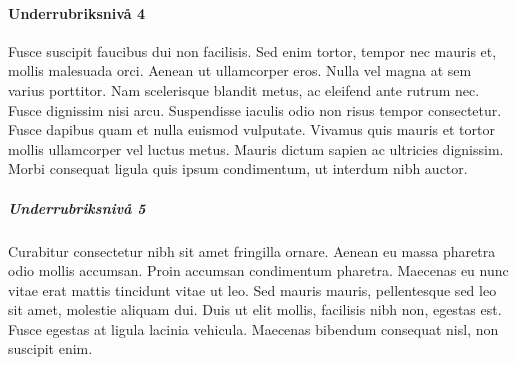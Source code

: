 \documentclass[a4paper,12pt]{article} %
\begin{document}
\paragraph{Underrubriksnivå 4}
Fusce suscipit faucibus dui non facilisis. Sed enim tortor, tempor nec mauris et, mollis malesuada orci. Aenean ut ullamcorper eros. Nulla vel magna at sem varius porttitor. Nam scelerisque blandit metus, ac eleifend ante rutrum nec. Fusce dignissim nisi arcu. Suspendisse iaculis odio non risus tempor consectetur. Fusce dapibus quam et nulla euismod vulputate. Vivamus quis mauris et tortor mollis ullamcorper vel luctus metus. Mauris dictum sapien ac ultricies dignissim. Morbi consequat ligula quis ipsum condimentum, ut interdum nibh auctor.
\subparagraph{Underrubriksnivå 5}
Curabitur consectetur nibh sit amet fringilla ornare. Aenean eu massa pharetra odio mollis accumsan. Proin accumsan condimentum pharetra. Maecenas eu nunc vitae erat mattis tincidunt vitae ut leo. Sed mauris mauris, pellentesque sed leo sit amet, molestie aliquam dui. Duis ut elit mollis, facilisis nibh non, egestas est. Fusce egestas at ligula lacinia vehicula. Maecenas bibendum consequat nisl, non suscipit enim.
%
\newpage


\newpage
\appendix

\end{document}
